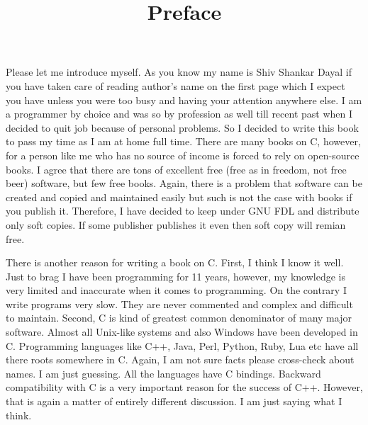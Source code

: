 


\title{Preface}
Please let me introduce myself. As you know my name is Shiv Shankar Dayal if
you have taken care of reading author's name on the first page which I expect
you have unless you were too busy and having your attention anywhere else.
I am a programmer by choice and was so by profession as well till recent past
when I decided to quit job because of personal problems. So I decided to write
this book to pass my time as I am at home full time. There are many books on C,
however, for a person like me who has no source of income is forced to rely
on open-source books. I agree that there are tons of excellent free (free as in
freedom, not free beer) software, but few free books. Again, there is a problem
that software can be created and copied and maintained easily but such is not
the case with books if you publish it. Therefore, I have decided to keep under
GNU FDL and distribute only soft copies. If some publisher publishes it even
then soft copy will remian free.

There is another reason for writing a book on C. First, I think I know it well.
Just to brag I have been programming for 11 years, however, my knowledge is
very limited and inaccurate when it comes to programming. On the contrary I
write programs very slow. They are never commented and complex and difficult
to maintain. Second, C is kind of greatest common denominator of many major
software. Almost all Unix-like systems and also Windows have been developed
in C. Programming languages like C++, Java, Perl, Python, Ruby, Lua etc have all
there roots somewhere in C. Again, I am not sure facts please cross-check
about names. I am just guessing. All the languages have C bindings. Backward
compatibility with C is a very important reason for the success of C++.
However, that is again a matter of entirely different discussion. I am just
saying what I think.

